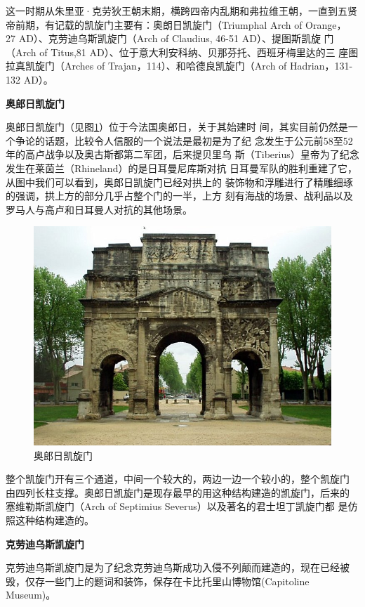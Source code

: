 \documentclass[a4paper,dvipdfm]{article}
\begin{document}
这一时期从朱里亚·克劳狄王朝末期，横跨四帝内乱期和弗拉维王朝，一直到五贤
帝前期，有记载的凯旋门主要有：奥朗日凯旋门（Triumphal Arch of Orange，
27 AD）、克劳迪乌斯凯旋门（Arch of Claudius, 46-51 AD）、提图斯凯旋
门（Arch of Titus,81 AD）、位于意大利安科纳、贝那芬托、西班牙梅里达的三
座图拉真凯旋门（Arches of Trajan，114）、和哈德良凯旋门（Arch of
Hadrian，131-132 AD）。


\textbf{奥郎日凯旋门}

奥郎日凯旋门（见图\ref{fig:orange}）位于今法国奥郎日，关于其始建时
间，其实目前仍然是一个争论的话题，比较令人信服的一个说法是最初是为了纪
念发生于公元前58至52年的高卢战争以及奥古斯都第二军团，后来提贝里乌
斯（Tiberius）皇帝为了纪念发生在莱茵兰（Rhineland）的是日耳曼尼库斯对抗
日耳曼军队的胜利重建了它，从图中我们可以看到，奥郎日凯旋门已经对拱上的
装饰物和浮雕进行了精雕细琢的强调，拱上方的部分几乎占整个门的一半，上方
刻有海战的场景、战利品以及罗马人与高卢和日耳曼人对抗的其他场景。

\begin{figure}[hbt!]
  \centering
  \includegraphics[width=\textwidth]{Arch_of_Orange}
  \caption{奥郎日凯旋门}
  \label{fig:orange}
\end{figure}

整个凯旋门开有三个通道，中间一个较大的，两边一边一个较小的，整个凯旋门
由四列长柱支撑。奥郎日凯旋门是现存最早的用这种结构建造的凯旋门，后来的
塞维勒斯凯旋门（Arch of Septimius Severus）以及著名的君士坦丁凯旋门都
是仿照这种结构建造的。

\textbf{克劳迪乌斯凯旋门}

克劳迪乌斯凯旋门是为了纪念克劳迪乌斯成功入侵不列颠而建造的，现在已经被
毁，仅存一些门上的题词和装饰，保存在卡比托里山博物馆(Capitoline
Museum)。
\end{document}
